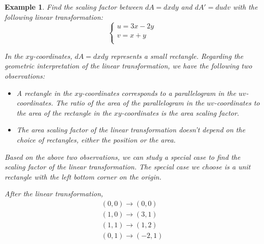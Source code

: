 \documentclass{article}
\newtheorem{example}{Example}
\begin{document}
\begin{example}
  Find the scaling factor between $dA = dx dy$ and $dA' = du dv$ with the 
  following linear transformation:
  \begin{equation*}
    \begin{cases}
      u = 3x - 2y \\
      v = x + y \\
    \end{cases}
  \end{equation*}

  In the $xy$-coordinates, $dA = dx dy$ represents a small rectangle. Regarding 
  the geometric interpretation of the linear transformation, we have the 
  following two observations:
  \begin{itemize}
    \item A rectangle in the $xy$-coordinates corresponds to a parallelogram in 
    the $uv$-coordinates. The ratio of the area of the parallelogram in the 
    $uv$-coordinates to the area of the rectangle in the $xy$-coordinates is the 
    area scaling factor.
    \item The area scaling factor of the linear transformation doesn't depend on 
    the choice of rectangles, either the position or the area.
  \end{itemize}

  Based on the above two observations, we can study a special case to find the 
  scaling factor of the linear transformation. The special case we choose is a 
  unit rectangle with the left bottom corner on the origin.


  After the linear transformation,
  \begin{gather*}
    (0, 0) \rightarrow (0, 0) \\
    (1, 0) \rightarrow (3, 1) \\
    (1, 1) \rightarrow (1, 2) \\
    (0, 1) \rightarrow (-2, 1) \\
  \end{gather*}



\end{example}
\end{document}
